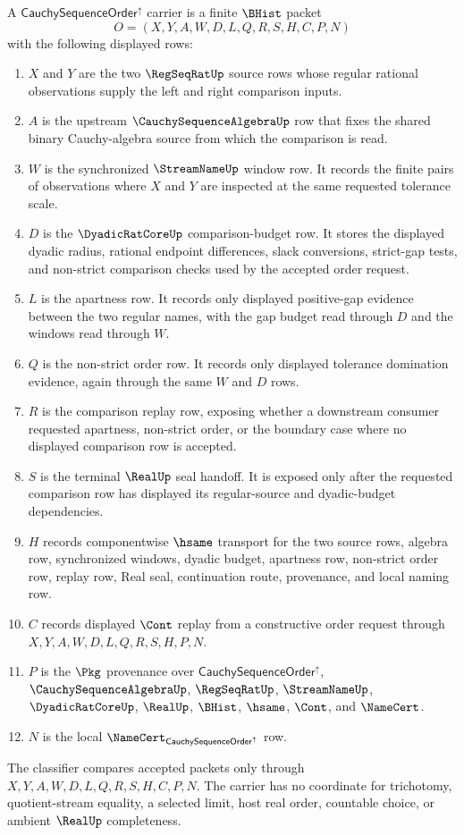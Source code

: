 \begin{definition}
\label{def:cauchy-sequence-order-carrier}
A $\mathsf{CauchySequenceOrder}^{\uparrow}$ carrier is a finite $\BHist$ packet
$$
O=(X,Y,A,W,D,L,Q,R,S,H,C,P,N)
$$
with the following displayed rows:
\begin{enumerate}
\item $X$ and $Y$ are the two $\RegSeqRatUp$ source rows whose regular rational observations supply the left and right comparison inputs.
\item $A$ is the upstream $\CauchySequenceAlgebraUp$ row that fixes the shared binary Cauchy-algebra source from which the comparison is read.
\item $W$ is the synchronized $\StreamNameUp$ window row. It records the finite pairs of observations where $X$ and $Y$ are inspected at the same requested tolerance scale.
\item $D$ is the $\DyadicRatCoreUp$ comparison-budget row. It stores the displayed dyadic radius, rational endpoint differences, slack conversions, strict-gap tests, and non-strict comparison checks used by the accepted order request.
\item $L$ is the apartness row. It records only displayed positive-gap evidence between the two regular names, with the gap budget read through $D$ and the windows read through $W$.
\item $Q$ is the non-strict order row. It records only displayed tolerance domination evidence, again through the same $W$ and $D$ rows.
\item $R$ is the comparison replay row, exposing whether a downstream consumer requested apartness, non-strict order, or the boundary case where no displayed comparison row is accepted.
\item $S$ is the terminal $\RealUp$ seal handoff. It is exposed only after the requested comparison row has displayed its regular-source and dyadic-budget dependencies.
\item $H$ records componentwise $\hsame$ transport for the two source rows, algebra row, synchronized windows, dyadic budget, apartness row, non-strict order row, replay row, Real seal, continuation route, provenance, and local naming row.
\item $C$ records displayed $\Cont$ replay from a constructive order request through $X,Y,A,W,D,L,Q,R,S,H,P,N$.
\item $P$ is the $\Pkg$ provenance over $\mathsf{CauchySequenceOrder}^{\uparrow}$, $\CauchySequenceAlgebraUp$, $\RegSeqRatUp$, $\StreamNameUp$, $\DyadicRatCoreUp$, $\RealUp$, $\BHist$, $\hsame$, $\Cont$, and $\NameCert$.
\item $N$ is the local $\NameCert_{\mathsf{CauchySequenceOrder}^{\uparrow}}$ row.
\end{enumerate}
The classifier compares accepted packets only through $X,Y,A,W,D,L,Q,R,S,H,C,P,N$. The carrier has no coordinate for trichotomy, quotient-stream equality, a selected limit, host real order, countable choice, or ambient $\RealUp$ completeness.
\end{definition}

